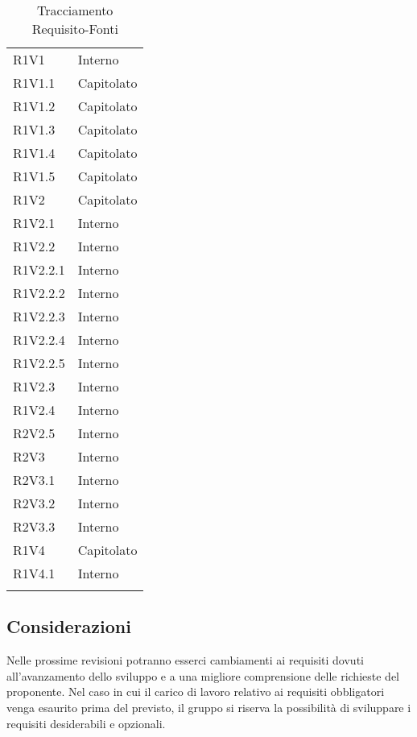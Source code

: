 \begin{longtable} {
			>{\centering}p{28mm}  
			>{}p{20mm}
		}
		R1V1 & Interno \TBstrut \\ [2mm]
		R1V1.1 & Capitolato \TBstrut \\ [2mm]
		R1V1.2 & Capitolato \TBstrut \\ [2mm]
		R1V1.3 & Capitolato \TBstrut \\ [2mm]
		R1V1.4 & Capitolato \TBstrut \\ [2mm]
		R1V1.5 & Capitolato \TBstrut \\ [2mm]
		R1V2 & Capitolato \TBstrut \\ [2mm]
		R1V2.1 & Interno \TBstrut \\ [2mm]
		R1V2.2 & Interno \TBstrut \\ [2mm]
		R1V2.2.1 & Interno \TBstrut \\ [2mm]
		R1V2.2.2 & Interno \TBstrut \\ [2mm]
		R1V2.2.3 & Interno \TBstrut \\ [2mm]
		R1V2.2.4 & Interno \TBstrut \\ [2mm]
		R1V2.2.5 & Interno \TBstrut \\ [2mm]
		R1V2.3 & Interno \TBstrut \\ [2mm]
		R1V2.4 & Interno \TBstrut \\ [2mm]
		R2V2.5 & Interno \TBstrut \\ [2mm]
		R2V3 & Interno \TBstrut \\ [2mm]
		R2V3.1 & Interno  \TBstrut \\ [2mm]		
		R2V3.2 & Interno  \TBstrut \\ [2mm]		
		R2V3.3 & Interno  \TBstrut \\ [2mm]		
		R1V4 & Capitolato  \TBstrut \\ [2mm]		
		R1V4.1 & Interno  \TBstrut \\ [2mm]
		\rowcolor{white}
		\caption{Tracciamento Requisito-Fonti}
	\end{longtable}
	\subsection{Considerazioni}
	Nelle prossime revisioni potranno esserci cambiamenti ai requisiti dovuti all'avanzamento dello sviluppo e a una migliore comprensione delle richieste del proponente. Nel caso in cui il carico di lavoro relativo ai requisiti obbligatori venga esaurito prima del previsto, il gruppo si riserva la possibilità di sviluppare i requisiti desiderabili e opzionali.